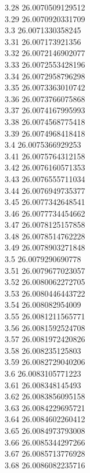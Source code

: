 {3.28	26.0070509129512\\
3.29	26.0070920331709\\
3.3	26.0071330358245\\
3.31	26.007173921356\\
3.32	26.0072146902077\\
3.33	26.0072553428196\\
3.34	26.0072958796298\\
3.35	26.0073363010742\\
3.36	26.0073766075868\\
3.37	26.0074167995993\\
3.38	26.0074568775418\\
3.39	26.0074968418418\\
3.4	26.0075366929253\\
3.41	26.0075764312158\\
3.42	26.0076160571353\\
3.43	26.0076555711034\\
3.44	26.0076949735377\\
3.45	26.0077342648541\\
3.46	26.0077734454662\\
3.47	26.0078125157858\\
3.48	26.0078514762228\\
3.49	26.0078903271848\\
3.5	26.0079290690778\\
3.51	26.0079677023057\\
3.52	26.0080062272705\\
3.53	26.0080446443722\\
3.54	26.008082954009\\
3.55	26.0081211565771\\
3.56	26.0081592524708\\
3.57	26.0081972420826\\
3.58	26.008235125803\\
3.59	26.0082729040206\\
3.6	26.0083105771223\\
3.61	26.008348145493\\
3.62	26.0083856095158\\
3.63	26.0084229695721\\
3.64	26.0084602260412\\
3.65	26.0084973793008\\
3.66	26.0085344297266\\
3.67	26.0085713776928\\
3.68	26.0086082235716\\
}
